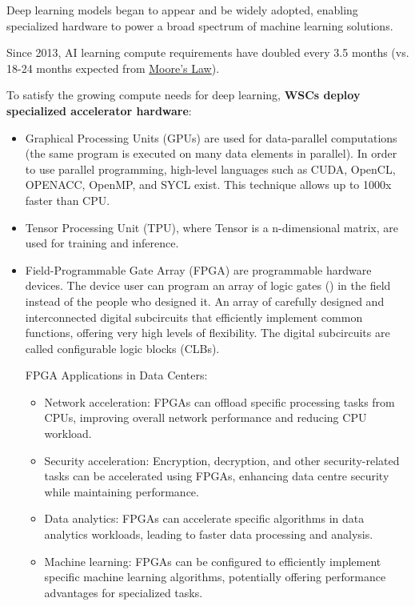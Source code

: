 \begin{deepeningbox}
    Deep learning models began to appear and be widely adopted, enabling specialized hardware to power a broad spectrum of machine learning solutions.
    
    Since 2013, AI learning compute requirements have doubled every 3.5 months (vs. 18-24 months expected from \href{https://en.wikipedia.org/wiki/Moore's_law}{Moore's Law}).

    To satisfy the growing compute needs for deep learning, \textbf{WSCs deploy specialized accelerator hardware}:
    \begin{itemize}
        \item Graphical Processing Units (GPUs) are used for data-parallel computations (the same program is executed on many data elements in parallel). In order to use parallel programming, high-level languages such as CUDA, OpenCL, OPENACC, OpenMP, and SYCL exist. This technique allows up to 1000x faster than CPU.


        \item Tensor Processing Unit (TPU), where Tensor is a n-dimensional matrix, are used for training and inference.


        \item Field-Programmable Gate Array (FPGA) are programmable hardware devices. The device user can program an array of logic gates () in the field instead of the people who designed it. An array of carefully designed and interconnected digital subcircuits that efficiently implement common functions, offering very high levels of flexibility. The digital subcircuits are called configurable logic blocks (CLBs).

        FPGA Applications in Data Centers:
        \begin{itemize}
            \item Network acceleration: FPGAs can offload specific processing tasks from CPUs, improving overall network performance and reducing CPU workload.

            \item Security acceleration: Encryption, decryption, and other security-related tasks can be accelerated using FPGAs, enhancing data centre security while maintaining performance.

            \item Data analytics: FPGAs can accelerate specific algorithms in data analytics workloads, leading to faster data processing and analysis.

            \item Machine learning: FPGAs can be configured to efficiently implement specific machine learning algorithms, potentially offering performance advantages for specialized tasks.
        \end{itemize}
    \end{itemize}
\end{deepeningbox}


